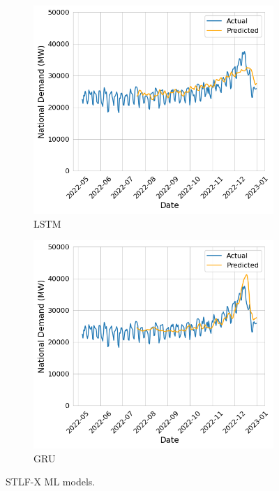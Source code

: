 \documentclass[12pt]{scrreprt}
\begin{document}
\begin{figure}[h]
    \centering
    \begin{subfigure}{.5\textwidth}
        \centering
        \includegraphics[width=\linewidth]{Images/stmc_plot.png}
        \caption{LSTM}
        \label{fig:stmc_plot}
    \end{subfigure}%
    \begin{subfigure}{.5\textwidth}
        \centering
        \includegraphics[width=\linewidth]{Images/gstmc_plot.png}
        \caption{GRU}
        \label{fig:gstmc_plot}
    \end{subfigure}
    \caption{STLF-X ML models.}
    \label{fig:stlfx_ml}
\end{figure}
\end{document}
